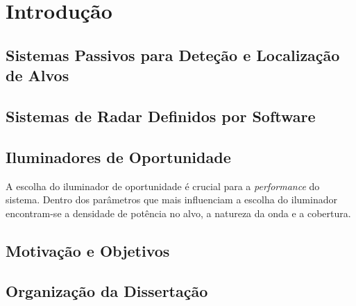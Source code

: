% 
\chapter{Introdução} %
\label{chap:Chapter1} %


%




\section{Sistemas Passivos para Deteção e Localização de Alvos}


\section{Sistemas de Radar Definidos por Software}


\section{Iluminadores de Oportunidade} \label{IOS}
A escolha do iluminador de oportunidade é crucial para a \textit{performance} do sistema. Dentro dos parâmetros que mais influenciam a escolha do iluminador encontram-se a densidade de potência no alvo, a natureza da onda e a cobertura.

\section{Motivação e Objetivos}


\section{Organização da Dissertação}